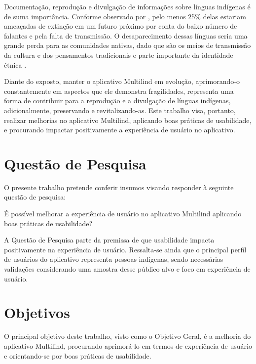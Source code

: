 Documentação, reprodução e divulgação de informações sobre línguas indígenas é de suma importância. Conforme observado por ,
pelo menos 25\% delas estariam ameaçadas de extinção em um futuro próximo por conta do baixo número de falantes e pela falta de transmissão. O desaparecimento dessas línguas
seria uma grande perda para as comunidades nativas, dado que são os meios de transmissão da cultura e dos pensamentos tradicionais e parte importante da identidade étnica
\cite{moore2008}.

Diante do exposto, manter o aplicativo Multilind em evolução, aprimorando-o constantemente em aspectos que ele demonstra fragilidades, representa uma forma de
contribuir para a reprodução e a divulgação de línguas indígenas, adicionalmente, preservando e revitalizando-as. Este trabalho visa, portanto,
realizar melhorias no aplicativo Multilind, aplicando boas práticas de usabilidade, e procurando impactar positivamente a experiência de usuário no aplicativo.

\section{Questão de Pesquisa}
\label{sec:QuestaodePesquisa}

O presente trabalho pretende conferir insumos visando responder à seguinte questão de pesquisa:

É  possível melhorar a experiência de usuário no aplicativo Multilind aplicando boas práticas de usabilidade? 

A Questão de Pesquisa parte da premissa de que usabilidade impacta positivamente na experiência de usuário. Ressalta-se ainda que o principal perfil de usuários do aplicativo 
representa pessoas indígenas, sendo necessárias validações considerando uma amostra desse público alvo e foco em experiência de usuário.

\section{Objetivos}
\label{sec:Objetivos}

O principal objetivo deste trabalho, visto como o Objetivo Geral, é a melhoria do aplicativo Multilind, procurando aprimorá-lo em termos de experiência de usuário e
orientando-se por boas práticas de usabilidade. 


